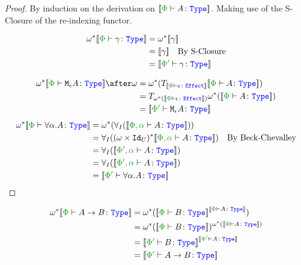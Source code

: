 \documentclass{report}
\begin{document}
\begin{framed}
    \begin{proof}
            By induction on the derivation on $\deno{\typerelation{\P}{A}{\type}}$. Making use of the S-Closure of the re-indexing functor.
            
            \case{\tground}
            \begin{align*}
                \w\star\deno{\typerelation{\P}{\g}{\type}} &= \w\star\deno{\g}\\
                & =  \deno{\g}\qt{By S-Closure}\\
                & = \deno{\typerelation{\P'}{\g}{\type}}
            \end{align*}
            
            \case{\teffect}
            \begin{align*}
                \w\star\deno{\typerelation{\P}{\mea}{\type}}\after\w & =  \w\star(\T{\deno{\typerelation{\P}{\e}{\effect}}}{\deno{\typerelation{\P}{A}{\type}}})\\
                &= \T{\w\star(\deno{\typerelation{\P}{\e}{\effect}})}{\w\star(\deno{\typerelation{\P}{A}{\type}})}\\
                & = \deno{\typerelation{\P'}{\mea}{\type}}
            \end{align*}
            \case{\tquant}
                \begin{align*}
                    \w\star\deno{\typerelation{\P}{\all{\a}A}{\type}} & = \w\star(\allI(\deno{\typerelation{\P,\a}{A}{\type}}))\\
                    & = \allI((\w\times\Id{U})\star\deno{\typerelation{\P,\a}{A}{\type}})\qt{By Beck-Chevalley}\\
                    & = \allI(\deno{\typerelation{\P',\a}{A}{\type}})\\
                    & = \allI(\deno{\typerelation{\P',\a}{A}{\type}})\\
                    & = \deno{\typerelation{\P'}{\all{\a}{A}}{\type}}\\
                \end{align*}
    \end{proof}
        
\end{framed}
    \case{\tfun}
    \begin{align*}
        \w\star\deno{\typerelation{\P}{\ab}{\type}} &= \w\star(\deno{\typerelation{\P}{B}{\type}}^{\deno{\typerelation{\P}{A}{\type}}})\\
        &=\w\star(\deno{\typerelation{\P}{B}{\type}})^{\w\star(\deno{\typerelation{\P}{A}{\type}})}\\
        & = \deno{\typerelation{\P'}{B}{\type}}^{\deno{\typerelation{\P'}{A}{\type}}}\\
        & = \deno{\typerelation{\P'}{\ab}{\type}}\\
    \end{align*}
\end{document}
